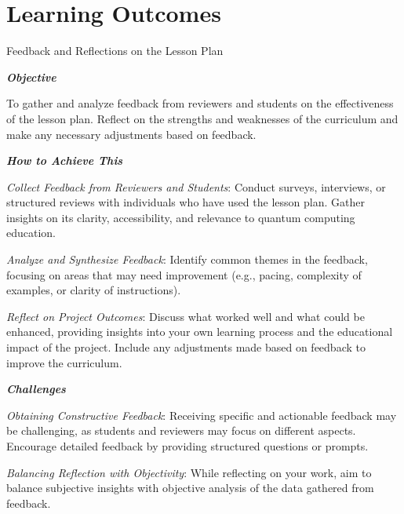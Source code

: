 \section{Learning Outcomes}

Feedback and Reflections on the Lesson Plan

\textbf{\emph{Objective}}

To gather and analyze feedback from reviewers and students on the effectiveness of the lesson plan. Reflect on the strengths and weaknesses of the curriculum and make any necessary adjustments based on feedback.

\textbf{\emph{How to Achieve This}}

\emph{Collect Feedback from Reviewers and Students}: Conduct surveys, interviews, or structured reviews with individuals who have used the lesson plan. Gather insights on its clarity, accessibility, and relevance to quantum computing education.

\emph{Analyze and Synthesize Feedback}: Identify common themes in the feedback, focusing on areas that may need improvement (e.g., pacing, complexity of examples, or clarity of instructions).

\emph{Reflect on Project Outcomes}: Discuss what worked well and what could be enhanced, providing insights into your own learning process and the educational impact of the project. Include any adjustments made based on feedback to improve the curriculum.

\textbf{\emph{Challenges}}

\emph{Obtaining Constructive Feedback}: Receiving specific and actionable feedback may be challenging, as students and reviewers may focus on different aspects. Encourage detailed feedback by providing structured questions or prompts.

\emph{Balancing Reflection with Objectivity}: While reflecting on your work, aim to balance subjective insights with objective analysis of the data gathered from feedback.
    

